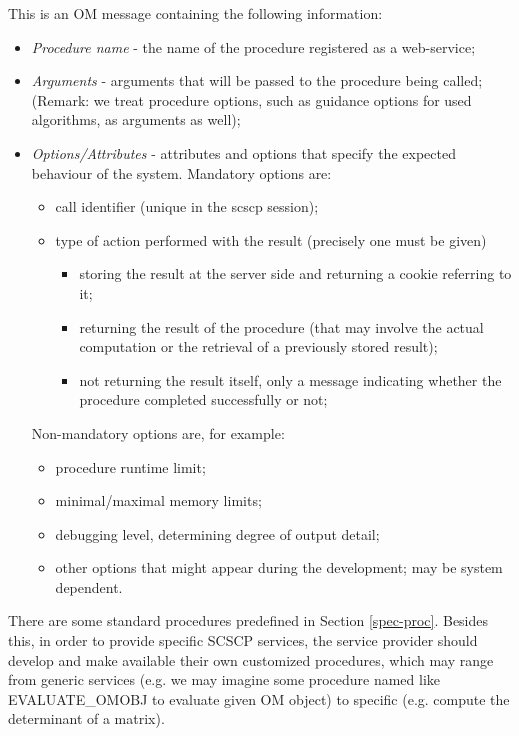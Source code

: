 \documentclass{amsart}
\begin{document}
This is an OM message containing the following information:
\begin{itemize}
\item {\it Procedure name} - the name of the procedure registered as a web-service;
\item {\it Arguments} - arguments that will be passed to the procedure being called;
      (Remark: we treat procedure options, such as guidance options for used algorithms, as
      arguments as well);
\item {\it Options/Attributes} - attributes and options that specify the expected behaviour 
      of the system. Mandatory options are:
\begin{itemize}
    \item call identifier (unique in the scscp session);
    \item type of action performed with the result (precisely one must be given)
	\begin{itemize}
		\item storing the result at the server side and returning a cookie referring to it;
		\item returning the result of the procedure (that may involve the actual computation or the retrieval of a previously stored result);
		\item not returning the result itself, only a message indicating whether the procedure completed successfully or not;
	\end{itemize}
\end{itemize}
Non-mandatory options are, for example:
\begin{itemize}
	\item procedure runtime limit;
	\item minimal/maximal memory limits;
	\item debugging level, determining degree of output detail;
	\item other options that might appear during the development; may be system dependent.
\end{itemize}
\end{itemize}

There are some standard procedures predefined in Section \ref{spec-proc}. 
Besides this, in order to provide specific SCSCP services, the service provider should 
develop and make available their own customized procedures, which may range from 
generic services (e.g. we may imagine some procedure named like {\sf EVALUATE\_OMOBJ} 
to evaluate given OM object) to specific (e.g. compute the determinant of a matrix).
\end{document}
